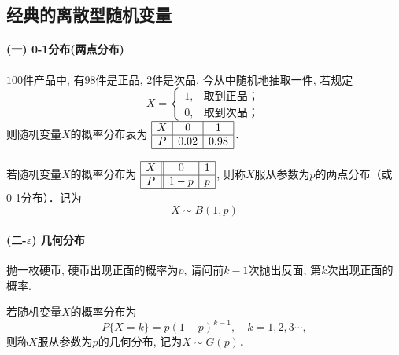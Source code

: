 \subsection{经典的离散型随机变量}

\paragraph{(一) 0-1分布(两点分布)}

\begin{example}
    $100$件产品中, 有$98$件是正品, $2$件是次品, 今从中随机地抽取一件, 若规定
    \[X=\left\{ \begin{array}{ll} 1, & \text{取到正品；} \\
             0,      & \text{取到次品；}\end{array} \right.\]
    则随机变量$X$的概率分布表为
    $\begin{array}{|c|c|c|}\hline
            X & 0    & 1    \\ \hline
            P & 0.02 & 0.98 \\ \hline
        \end{array}$．
\end{example}

\begin{definition}[两点分布(0-1分布)]
    若随机变量$X$的概率分布为
    $\begin{array}{|c||c|c|}\hline
            X & 0   & 1 \\ \hline
            P & 1-p & p \\ \hline
        \end{array}$, 
    则称$X$服从参数为$p$的两点分布（或 0-1分布）．记为$$X\sim B(1,p)$$
\end{definition}

\paragraph{(二-$\varepsilon$) 几何分布}

\begin{example}
    抛一枚硬币, 硬币出现正面的概率为$p$, 请问前$k-1$次抛出反面, 第$k$次出现正面的概率.
\end{example}

\begin{definition}
    若随机变量$X$的概率分布为
    \[P\{X=k\}=p(1-p)^{k-1},\quad k=1,2,3\cdots,\]
    则称$X$服从参数为$p$的几何分布, 记为$X\sim G(p)$．
\end{definition}

